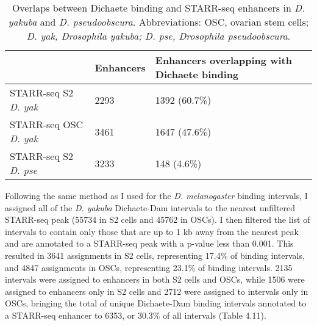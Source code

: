 \begin{table}[h]
\centering
\begin{tabular}{|l|l|p{6cm}|}
\hline
                     & \textbf{Enhancers} & \textbf{Enhancers overlapping with Dichaete binding} \\ \hline
STARR-seq S2 \emph{D. yak}  & 2293      & 1392 (60.7\%)                               \\ \hline
STARR-seq OSC \emph{D. yak} & 3461      & 1647 (47.6\%)                               \\ \hline
STARR-seq S2 \emph{D. pse}  & 3233      & 148 (4.6\%)                                 \\ \hline
\end{tabular}
\caption{Overlaps between Dichaete binding and STARR-seq enhancers in \emph{D. yakuba} and \emph{D. pseudoobscura}. Abbreviations: OSC, ovarian stem cells; \emph{D. yak, Drosophila yakuba; D. pse, Drosophila pseudoobscura}.}
\label{Table 4.10}
\end{table}

Following the same method as I used for the \emph{D. melanogaster} binding intervals, I assigned all of the \emph{D. yakuba} Dichaete-Dam intervals to the nearest unfiltered STARR-seq peak (55734 in S2 cells and 45762 in OSCs). I then filtered the list of intervals to contain only those that are up to 1 kb away from the nearest peak and are annotated to a STARR-seq peak with a p-value less than 0.001. This resulted in 3641 assignments in S2 cells, representing 17.4\% of binding intervals, and 4847 assignments in OSCs, representing 23.1\% of binding intervals. 2135 intervals were assigned to enhancers in both S2 cells and OSCs, while 1506 were assigned to enhancers only in S2 cells and 2712 were assigned to intervals only in OSCs, bringing the total of unique Dichaete-Dam binding intervals annotated to a STARR-seq enhancer to 6353, or 30.3\% of all intervals (Table 4.11).\\

